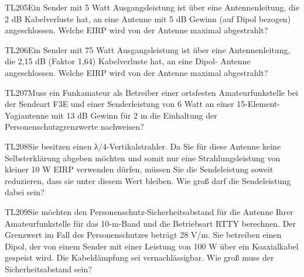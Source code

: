 \begin{question}{TL205}{Ein Sender mit 5 Watt Ausgangsleistung ist über eine Antennenleitung, die 2 dB Kabelverluste hat, an eine Antenne mit 5 dB Gewinn (auf Dipol bezogen) angeschlossen. Welche EIRP wird von der Antenne maximal abgestrahlt?}
\end{question}

\begin{question}{TL206}{Ein Sender mit 75 Watt Ausgangsleistung ist über eine Antennenleitung, die 2,15 dB (Faktor 1,64) Kabelverluste hat, an eine Dipol- Antenne angeschlossen. Welche EIRP wird von der Antenne maximal abgestrahlt?}
\end{question}

\begin{question}{TL207}{Muss ein Funkamateur als Betreiber einer ortsfesten Amateurfunkstelle bei der Sendeart F3E und einer Senderleistung von 6 Watt an einer 15-Element-Yagiantenne mit 13 dB Gewinn für 2 m die Einhaltung der Personenschutzgrenzwerte nachweisen?}
\end{question}

\begin{question}{TL208}{Sie besitzen einen λ/4-Vertikalstrahler. Da Sie für diese Antenne keine Selbsterklärung abgeben möchten und somit nur eine Strahlungsleistung von kleiner 10 W EIRP verwenden dürfen, müssen Sie die Sendeleistung soweit reduzieren, dass sie unter diesem Wert bleiben. Wie groß darf die Sendeleistung dabei sein?}
\end{question}

\begin{question}{TL209}{Sie möchten den Personenschutz-Sicherheitsabstand für die Antenne Ihrer Amateurfunkstelle für das 10-m-Band und die Betriebsart RTTY berechnen. Der Grenzwert im Fall des Personenschutzes beträgt 28 V/m. Sie betreiben einen Dipol, der von einem Sender mit einer Leistung von 100 W über ein Koaxialkabel gespeist wird. Die Kabeldämpfung sei vernachlässigbar. Wie groß muss der Sicherheitsabstand sein?}
\end{question}

